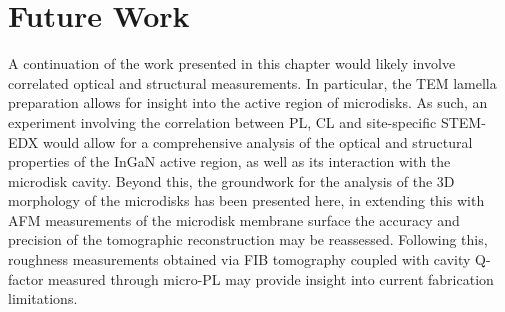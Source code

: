 \section{Future Work}
A continuation of the work presented in this chapter would likely involve correlated optical and structural measurements. In particular, the TEM lamella preparation allows for insight into the active region of microdisks. As such, an experiment involving the correlation between PL, CL and site-specific STEM-EDX would allow for a comprehensive analysis of the optical and structural properties of the InGaN active region, as well as its interaction with the microdisk cavity. Beyond this, the groundwork for the analysis of the 3D morphology of the microdisks has been presented here, in extending this with AFM measurements of the microdisk membrane surface the accuracy and precision of the tomographic reconstruction may be reassessed. Following this, roughness measurements obtained via FIB tomography coupled with cavity Q-factor measured through micro-PL may provide insight into current fabrication limitations.







